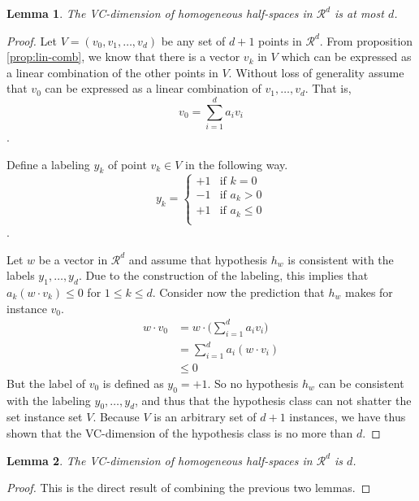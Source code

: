 \documentclass[12pt]{article}
\newtheorem{lemma}{Lemma}[section]
\begin{document}
\begin{enumerate}
\begin{lemma}
    The VC-dimension of homogeneous half-spaces in $\mathcal{R}^d$ is at most $d$.
\end{lemma}

\begin{proof}
    Let $V=(v_0, v_1, \dots, v_d)$ be any set of $d+1$ points in $\mathcal{R}^d$.
    From proposition \ref{prop:lin-comb}, we know that there is a vector $v_k$ in $V$ which can be expressed as a linear combination of the other points in $V$.
    Without loss of generality assume that $v_0$ can be expressed as a linear combination of $v_1, \dots, v_d$.
    That is,
    \[
    v_0 = \sum_{i=1}^{d} a_i v_i
    \].

    Define a labeling $y_k$ of point $v_k \in V$ in the following way.
    \[
    y_k = \begin{cases}
        +1  &  \text{if } k = 0   \\
        -1  &  \text{if } a_k > 0 \\
        +1  &  \text{if } a_k \leq 0 \\
    \end{cases}
    \].

    Let $w$ be a vector in $\mathcal{R}^d$ and assume that hypothesis $h_w$ is consistent with the labels $y_1, \dots, y_d$.
    Due to the construction of the labeling, this implies that $a_k (w \cdot v_k) \leq 0$ for $1 \leq k \leq d$.
    Consider now the prediction that $h_w$ makes for instance $v_0$.
    \begin{align*}
        w \cdot v_0 &= w \cdot \bigg( \sum_{i=1}^{d} a_i v_i \bigg) \\
            &= \sum_{i=1}^{d} a_i (w \cdot v_i) \\
            &\leq 0
    \end{align*}
    But the label of $v_0$ is defined as $y_0 = +1$.
    So no hypothesis $h_w$ can be consistent with the labeling $y_0, \dots, y_d$, and thus that the hypothesis class can not shatter the set instance set $V$.
    Because $V$ is an arbitrary set of $d+1$ instances, we have thus shown that the VC-dimension of the hypothesis class is no more than $d$.
\end{proof}

\begin{lemma}
    The VC-dimension of homogeneous half-spaces in $\mathcal{R}^d$ is $d$.
\end{lemma}
\begin{proof}
    This is the direct result of combining the previous two lemmas.
\end{proof}


\end{enumerate}
\end{document}
